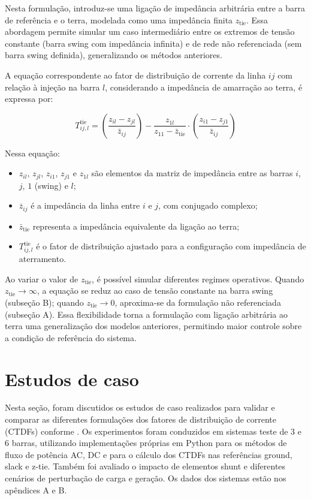 \documentclass[journal]{IEEEtran}
\begin{document}
Nesta formulação, introduz-se uma ligação de impedância arbitrária entre a barra de referência e o terra, modelada como uma impedância finita \( z_{\text{tie}} \). Essa abordagem permite simular um caso intermediário entre os extremos de tensão constante (barra swing com impedância infinita) e de rede não referenciada (sem barra swing definida), generalizando os métodos anteriores.

A equação correspondente ao fator de distribuição de corrente da linha \( ij \) com relação à injeção na barra \( l \), considerando a impedância de amarração ao terra, é expressa por:

\begin{equation}
T^{\text{tie}}_{ij,l} = \left( \frac{z_{il} - z_{jl}}{\bar{z}_{ij}} \right) - \frac{z_{1l}}{z_{11} - \bar{z}_{\text{tie}}} \cdot \left( \frac{z_{i1} - z_{j1}}{\bar{z}_{ij}} \right)
\label{eq:lig_terra}
\end{equation}

Nessa equação:
\begin{itemize}
  \item \( z_{il} \), \( z_{jl} \), \( z_{i1} \), \( z_{j1} \) e \( z_{1l} \) são elementos da matriz de impedância entre as barras \( i \), \( j \), \( 1 \) (swing) e \( l \);
  \item \( \bar{z}_{ij} \) é a impedância da linha entre \( i \) e \( j \), com conjugado complexo;
  \item \( \bar{z}_{\text{tie}} \) representa a impedância equivalente da ligação ao terra;
  \item \( T^{\text{tie}}_{ij,l} \) é o fator de distribuição ajustado para a configuração com impedância de aterramento.
\end{itemize}

Ao variar o valor de \( z_{\text{tie}} \), é possível simular diferentes regimes operativos. Quando \( z_{\text{tie}} \rightarrow \infty \), a equação se reduz ao caso de tensão constante na barra swing (subseção B); quando \( z_{\text{tie}} \rightarrow 0 \), aproxima-se da formulação não referenciada (subseção A). Essa flexibilidade torna a formulação com ligação arbitrária ao terra uma generalização dos modelos anteriores, permitindo maior controle sobre a condição de referência do sistema.


\section{Estudos de caso}
Nesta seção, foram discutidos os estudos de caso realizados para validar e comparar as diferentes formulações dos fatores de distribuição de corrente (CTDFs) conforme \cite{ref1}. Os experimentos foram conduzidos em sistemas teste de 3 e 6 barras, utilizando implementações próprias em Python para os métodos de fluxo de potência AC, DC e para o cálculo dos CTDFs nas referências ground, slack e z-tie. Também foi avaliado o impacto de elementos shunt e diferentes cenários de perturbação de carga e geração. Os dados dos sistemas estão nos apêndices A e B.
\end{document}
